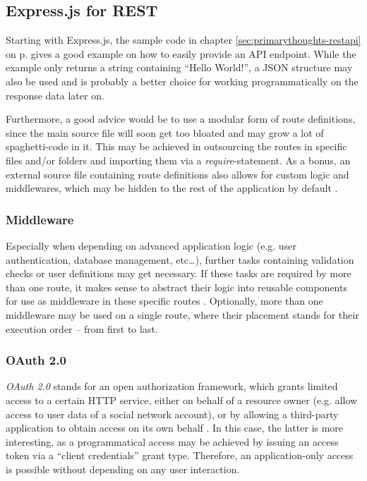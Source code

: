 \subsection{Express.js for REST}
\label{sec:foundation-express}
Starting with Express.js, the sample code in chapter \ref{sec:primarythoughts-restapi} on p. \pageref{sec:primarythoughts-restapi} gives a good example on how to easily provide an API endpoint. While the example only returns a string containing ``Hello World!'', a JSON structure may also be used and is probably a better choice for working programmatically on the response data later on.

Furthermore, a good advice would be to use a modular form of route definitions, since the main source file will soon get too bloated and may grow a lot of spaghetti-code in it. This may be achieved in outsourcing the routes in specific files and/or folders and importing them via a \emph{require}-statement. As a bonus, an external source file containing route definitions also allows for custom logic and middlewares, which may be hidden to the rest of the application by default \cite[p. 220f]{cantelon2017node}.

\subsubsection{Middleware}
Especially when depending on advanced application logic (e.g. user authentication, database management, etc\ldots), further tasks containing validation checks or user definitions may get necessary. If these tasks are required by more than one route, it makes sense to abstract their logic into reusable components for use as middleware in these specific routes \cite[223]{cantelon2017node}. Optionally, more than one middleware may be used on a single route, where their placement stands for their execution order -- from first to last.



\subsubsection{OAuth 2.0}
\label{sec:foundation-express-oauth}
\emph{OAuth 2.0} stands for an open authorization framework, which grants limited access to a certain HTTP service, either on behalf of a resource owner (e.g. allow access to user data of a social network account), or by allowing a third-party application to obtain access on its own behalf \cite[1]{hardt2012oauth}. In this case, the latter is more interesting, as a programmatical access may be achieved by issuing an access token via a ``client credentials'' grant type. Therefore, an application-only access is possible without depending on any user interaction.

